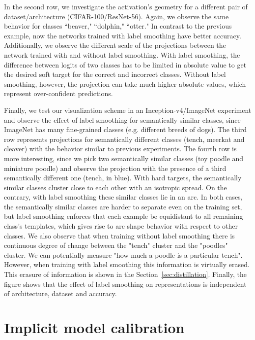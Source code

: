 \documentclass{article}
\begin{document}
In the second row, we investigate the activation's geometry for a different pair of dataset/architecture (CIFAR-100/ResNet-56). Again, we observe the same behavior for classes ``beaver," ``dolphin," ``otter." In contrast to the previous example, now the networks trained with label smoothing have better accuracy. Additionally, we observe the different scale of the projections between the network trained with and without label smoothing. With label smoothing, the difference between logits of two classes has to be limited in absolute value to get the desired soft target for the correct and incorrect classes. Without label smoothing, however, the projection can take much higher absolute values, which represent over-confident predictions. 


Finally, we test our visualization scheme in an Inception-v4/ImageNet experiment and observe the effect of label smoothing for semantically similar classes, since ImageNet has many fine-grained classes (e.g. different breeds of dogs). The third row represents projections for semantically  different classes (tench, meerkat and cleaver) with the behavior similar to previous experiments. The fourth row is more interesting, since we pick two semantically similar classes (toy poodle and miniature poodle) and observe the projection with the presence of a third semantically different one (tench, in blue). With hard targets, the semantically similar classes cluster close to each other with an isotropic spread. On the contrary, with label smoothing these similar classes lie in an arc. In both cases, the semantically similar classes are harder to separate even on the training set, but label smoothing %
enforces that each example be equidistant to all remaining class's templates, which gives rise to arc shape behavior with respect to other classes. We also observe that when training without label smoothing there is continuous degree of change between the "tench" cluster and the "poodles" cluster. We can potentially measure "how much a poodle is a particular tench". However, when training with label smoothing this information is virtually erased. This erasure of information is shown in the Section~\ref{sec:distillation}. Finally, the figure shows that the effect of label smoothing on representations is independent of architecture, dataset and accuracy. 

\section{Implicit model calibration}
\label{sec:calibration}
\end{document}
